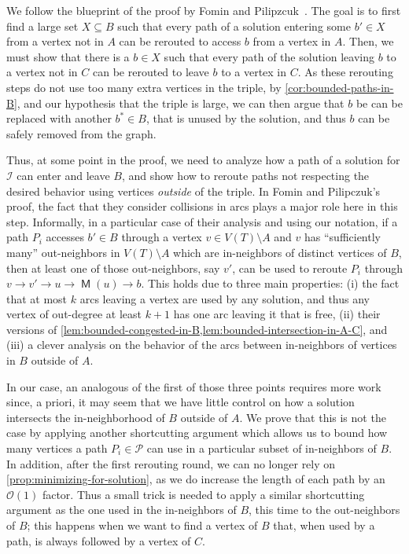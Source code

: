 \documentclass[a4paper,UKenglish,cleveref, autoref, thm-restate]{lipics-v2021}
\DeclareMathOperator{\Mat}{\mathsf M}
\newcommand{\bigO}[1]{\mathcal{O}\!\left(#1\right)}
\begin{document}
We follow the blueprint of the proof by Fomin and Pilipzcuk~\cite[Theorem 9.1]{FOMIN201978}.
The goal is to first find a large set $X \subseteq B$ such that every path of a solution entering some $b' \in X$ from a vertex not in $A$  can be rerouted to access $b$ from a vertex in $A$.
Then, we must show that there is a $b \in X$ such that every path of the solution leaving $b$ to a vertex not in $C$ can be rerouted to leave $b$ to a vertex in $C$.
As these rerouting steps do not use too many extra vertices in the triple, by \autoref{cor:bounded-paths-in-B}, and our hypothesis that the triple is large, we can then argue that $b$ be can be replaced with another $b^* \in B$, that is unused by the solution, and thus $b$ can be safely removed from the graph.

Thus, at some point in the proof, we need to analyze how a path of a solution for $\mathcal{I}$ can enter and leave $B$, and show how to reroute paths not respecting the desired behavior using vertices \emph{outside} of the triple.
In Fomin and Pilipczuk's proof, the fact that they consider collisions in arcs plays  a major role here in this step.
Informally, in a particular case of their analysis and using our notation, if a path $P_i$ accesses $b' \in B$ through a vertex $v \in V(T) \setminus A$ and $v$ has ``sufficiently many'' out-neighbors in $V(T) \setminus A$ which are in-neighbors of distinct vertices of $B$, then at least one of those out-neighbors, say $v'$, can be used to reroute $P_i$ through $v \to v' \to u \to \Mat(u) \to b$.
This holds due to three main properties: (i) the fact that at most $k$ arcs leaving a vertex are used by any solution, and thus any vertex of out-degree at least $k+1$ has one arc leaving it that is free, (ii) their versions of \cref{lem:bounded-congested-in-B,lem:bounded-intersection-in-A-C}, and (iii) a clever analysis on the behavior of the arcs between in-neighbors of vertices in $B$ outside of $A$.

In our case, an analogous of the first of those three points requires more work since, a priori, it may seem that we have little control on how a solution intersects the in-neighborhood of $B$ outside of $A$.
We prove that this is not the case by applying another shortcutting argument which allows us to bound how many vertices a path $P_i \in \mathcal{P}$ can use in a particular subset of in-neighbors of $B$.
In addition, after the first rerouting round, we can no longer rely on  \autoref{prop:minimizing-for-solution}, as we do increase the length of each path by an $\bigO{1}$ factor.
Thus a small trick is needed to apply a similar shortcutting argument as the one used in the in-neighbors of $B$, this time to the out-neighbors of $B$; this happens when we want to find a vertex of $B$ that, when used by a path, is always followed by a vertex of $C$.
\end{document}

